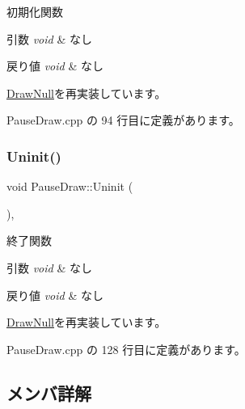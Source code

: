 初期化関数 


\begin{DoxyParams}{引数}
{\em void} & なし \\
\hline
\end{DoxyParams}

\begin{DoxyRetVals}{戻り値}
{\em void} & なし \\
\hline
\end{DoxyRetVals}


\mbox{\hyperlink{class_draw_null_a20aef1e54c1a158b741bfd731e18efdf}{Draw\+Null}}を再実装しています。



 Pause\+Draw.\+cpp の 94 行目に定義があります。

\mbox{\label{class_pause_draw_a2723bac62bfe180cc8af3c68948db376}} 
\subsubsection{\texorpdfstring{Uninit()}{Uninit()}}
{\footnotesize\ttfamily void Pause\+Draw\+::\+Uninit (\begin{DoxyParamCaption}{ }\end{DoxyParamCaption})\hspace{0.3cm}{\ttfamily [override]}, {\ttfamily [virtual]}}



終了関数 


\begin{DoxyParams}{引数}
{\em void} & なし \\
\hline
\end{DoxyParams}

\begin{DoxyRetVals}{戻り値}
{\em void} & なし \\
\hline
\end{DoxyRetVals}


\mbox{\hyperlink{class_draw_null_a6e81d63efab7333e8d0e8af99362a4d9}{Draw\+Null}}を再実装しています。



 Pause\+Draw.\+cpp の 128 行目に定義があります。



\subsection{メンバ詳解}
\mbox{\label{class_pause_draw_a28303189f2f9cf000bd8f2ca9d55ee05}} 
